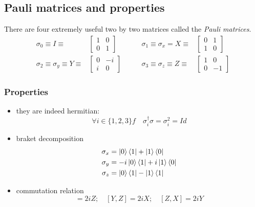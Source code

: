 \documentclass{article}
\begin{document}
\subsection{Pauli matrices and properties}
There are four extremely useful two by two matrices called the \textit{Pauli matrices}.
$$
\begin{aligned}
    \sigma_0 \equiv I \equiv &
        \begin{bmatrix}
            1 & 0 \\ 0 & 1
        \end{bmatrix}
    \quad & \quad
    \sigma_1 \equiv \sigma_x = X \equiv &
        \begin{bmatrix}
            0 & 1 \\ 1 & 0
        \end{bmatrix}
    \\
    \sigma_2 \equiv \sigma_y \equiv Y \equiv &
        \begin{bmatrix}
            0 & -i \\ i & 0
        \end{bmatrix}
    \quad & \quad
    \sigma_3 \equiv \sigma_z \equiv Z \equiv &
        \begin{bmatrix}
            1 & 0 \\ 0 & -1
        \end{bmatrix}
\end{aligned}
$$
\subsubsection*{Properties}
\begin{itemize}[label=-]
    \item they are indeed hermitian:
    \begin{equation}
        \forall i \in \{1, 2, 3\} f\quad \sigma_i^\dagger\sigma = \sigma_i^2 = Id
    \end{equation}
    \item braket decomposition
    \begin{equation}
        \begin{aligned}
            \sigma_x & = \ket{0}\bra{1} + \ket{1}\bra{0}
            \\
            \sigma_y & = -i\ket{0}\bra{1} + i\ket{1}\bra{0}
            \\
            \sigma_z & = \ket{0}\bra{1} - \ket{1}\bra{1}
        \end{aligned}
    \end{equation}
    \item commutation relation %
        \begin{equation}
            [X,Y] = 2iZ; \quad [Y, Z] = 2iX; \quad [Z,X] = 2iY
        \end{equation}
\end{itemize}
\end{document}
